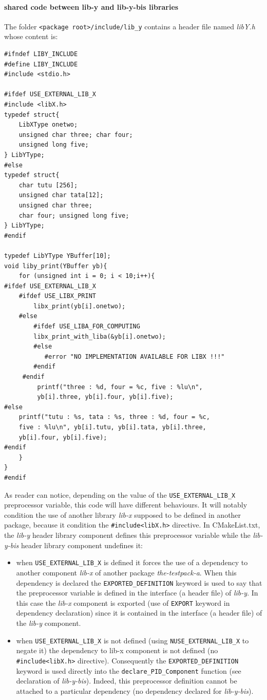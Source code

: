 \documentclass[12pt,a4paper]{article}
\begin{document}
\paragraph{shared code between lib-y and lib-y-bis libraries}
The folder \texttt{<package root>/include/lib\_y} contains a header file named \textit{libY.h} whose content is: 
\begin{verbatim}
#ifndef LIBY_INCLUDE
#define LIBY_INCLUDE
#include <stdio.h>

#ifdef USE_EXTERNAL_LIB_X
#include <libX.h>
typedef struct{
    LibXType onetwo;
    unsigned char three; char four;
    unsigned long five;
} LibYType;
#else
typedef struct{
    char tutu [256];
    unsigned char tata[12];
    unsigned char three;
    char four; unsigned long five;
} LibYType;
#endif

typedef LibYType YBuffer[10];
void liby_print(YBuffer yb){
    for (unsigned int i = 0; i < 10;i++){
#ifdef USE_EXTERNAL_LIB_X
    #ifdef USE_LIBX_PRINT
        libx_print(yb[i].onetwo);
    #else 
        #ifdef USE_LIBA_FOR_COMPUTING
        libx_print_with_liba(&yb[i].onetwo);
        #else
           #error "NO IMPLEMENTATION AVAILABLE FOR LIBX !!!"
        #endif
     #endif
	     printf("three : %d, four = %c, five : %lu\n", 
	     yb[i].three, yb[i].four, yb[i].five);
#else
    printf("tutu : %s, tata : %s, three : %d, four = %c, 
    five : %lu\n", yb[i].tutu, yb[i].tata, yb[i].three, 
    yb[i].four, yb[i].five);
#endif
    }
}
#endif
\end{verbatim}
As reader can notice, depending on the value of the \texttt{USE\_EXTERNAL\_LIB\_X} preprocessor variable, this code will have different behaviours. It will notably condition the use of another library \textit{lib-x} supposed to be defined in another package, because it condition the \texttt{\#include<libX.h>} directive. In CMakeList.txt, the \textit{lib-y} header library component defines this preprocessor variable while the \textit{lib-y-bis} header library component undefines it:
\begin{itemize}
\item when \texttt{USE\_EXTERNAL\_LIB\_X} is defined it forces the use of a dependency to another component \textit{lib-x} of another package \textit{the-testpack-a}. When this dependency is declared the \texttt{EXPORTED\_DEFINITION} keyword is used to say that the preprocessor variable is defined in the interface (a header file) of \textit{lib-y}. In this case the \textit{lib-x} component is exported (use of \texttt{EXPORT} keyword in dependency declaration) since it is contained in the interface (a header file) of the \textit{lib-y} component.
\item  when \texttt{USE\_EXTERNAL\_LIB\_X} is not defined (using \texttt{NUSE\_EXTERNAL\_LIB\_X} to negate it) the dependency to lib-x component is not defined (no \texttt{\#include<libX.h>} directive). Consequently the \texttt{EXPORTED\_DEFINITION} keyword is used directly into the \texttt{declare\_PID\_Component} function (see declaration of \textit{lib-y-bis}). Indeed, this preprocessor definition cannot be attached to a particular dependency (no dependency declared for \textit{lib-y-bis}).
\end{itemize}
\end{document}
